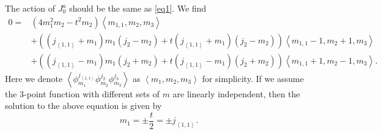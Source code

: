 \documentclass[10pt,a4paper]{article}
\numberwithin{equation}{section}
\newcommand{\vev}[1]{\left< #1 \right>}
\begin{document}
The action of $J^{a}_{0}$ should be the same as \ref{eq1}. We find 
\begin{equation}
    \begin{aligned}
    0= &\left(4 m_{1}^{2} m_{2} -t^{2} m_{2} \right) \vev{m_{1,1}, m_{2},m_{3}}\\
      & + \left( (j_{\vev{1,1}}+ m_{1})m_{1} (j_{2}-m_{2}) + t (j_{\vev{1,1}} + m_{1})(j_{2} - m_{2}) \right) \vev{m_{1,1}-1,m_{2}+1, m_{3}} \\
      & + \left( (j_{\vev{1,1}}- m_{1})m_{1} (j_{2}+m_{2}) + t (j_{\vev{1,1}} - m_{1})(j_{2} + m_{2}) \right) \vev{m_{1,1}+1,m_{2}-1, m_{3}}.
    \end{aligned}
\end{equation}
Here we denote $\vev{\phi^{j_{\vev{1,1}}}_{m_{1}} \phi^{j_{2}}_{m_{2}} \phi^{j_{3}}_{m_{3}}}$ as $\vev{m_{1},m_{2},m_{3}}$ for simplicity. 
If we assume the 3-point function with different sets of $m$ are linearly independent, then the solution to the above equation is given by 
\begin{equation}
    m_{1} = \pm \frac{t}{2} = \pm j_{\vev{1,1}}.
\end{equation}
\end{document}
